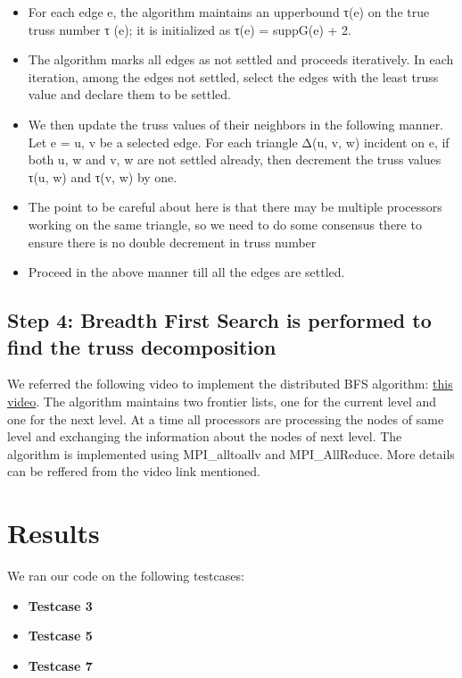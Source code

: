 \documentclass{article}
\begin{document}
\begin{itemize}
    \item For each edge e, the algorithm maintains an upperbound τ(e) on the true truss number τ (e); it is initialized as τ(e) = suppG(e) + 2.
    \item The algorithm marks all edges as not settled and proceeds iteratively. In each iteration, among the edges not settled, select the edges with the least truss value and declare them to be settled.
    \item We then update the truss values of their neighbors in the following manner. Let e = u, v be a selected edge. For each triangle Δ(u, v, w) incident on e, if both u, w and v, w are not settled already, then decrement the truss values τ(u, w) and τ(v, w) by one.
    \item The point to be careful about here is that there may be multiple processors working on the same triangle, so we need to do some consensus there to ensure there is no double decrement in truss number
    \item Proceed in the above manner till all the edges are settled.

\end{itemize}


\subsection{Step 4: Breadth First Search is performed to find the truss decomposition}
We referred the following video to implement the distributed BFS algorithm: \href{https://www.youtube.com/watch?v=wpWvCabHqQU}{this video}. The algorithm maintains two frontier lists, one for the current level and one for the next level. At a time all processors are processing the nodes of same level and exchanging the information about the nodes of next level. The algorithm is implemented using MPI_alltoallv and MPI_AllReduce. More details can be reffered from the video link mentioned.


\section{Results}
We ran our code on the following testcases:
\begin{itemize}
    \item \textbf{Testcase 3}
    \item \textbf{Testcase 5} 
    \item \textbf{Testcase 7}
\end{itemize}
\end{document}
